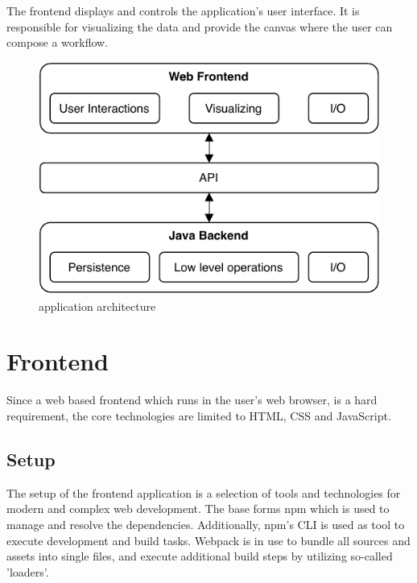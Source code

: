 \documentclass[a4paper,12pt,pdftex,halfparskip,cleardoubleempty,bibtotoc,liststotoc]{scrbook}
\begin{document}
The frontend displays and controls the application's user interface. It is responsible for visualizing the data and provide the canvas where the user can compose a workflow.

\begin{figure}[H]
  \centering
  \vspace{0.8cm}
  \includegraphics[scale=0.8]{architecture}
  \caption{application architecture}
\end{figure}

\section{Frontend}
Since a web based frontend which runs in the user's web browser, is a hard requirement, the core technologies are limited to HTML, CSS and JavaScript.

\subsection{Setup}

The setup of the frontend application is a selection of tools and technologies for modern and complex web development.
The base forms npm which is used to manage and resolve the dependencies. Additionally, npm's CLI is used as tool to execute development and build tasks. Webpack is in use to bundle all sources and assets into single files, and execute additional build steps by utilizing so-called 'loaders'.
\end{document}
